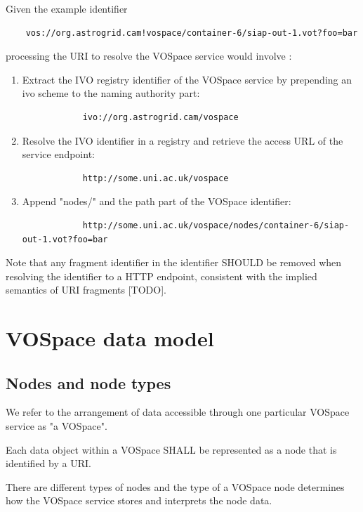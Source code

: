 \documentclass[11pt,a4paper]{ivoa}
\begin{document}
Given the example identifier

\begin{verbatim}
    vos://org.astrogrid.cam!vospace/container-6/siap-out-1.vot?foo=bar
\end{verbatim}

processing the URI to resolve the VOSpace service would involve :

\begin{enumerate}
    \item Extract the IVO registry identifier of the VOSpace service by prepending an ivo scheme to the naming authority part:
        \begin{verbatim}
            ivo://org.astrogrid.cam/vospace
        \end{verbatim}
    \item Resolve the IVO identifier in a registry and retrieve the access URL of the service endpoint:
        \begin{verbatim}
            http://some.uni.ac.uk/vospace
        \end{verbatim}
    \item Append "nodes/" and the path part of the VOSpace identifier:
        \begin{verbatim}
            http://some.uni.ac.uk/vospace/nodes/container-6/siap-out-1.vot?foo=bar
        \end{verbatim}
\end{enumerate}

Note that any fragment identifier in the identifier SHOULD be removed when resolving the identifier to a HTTP endpoint, consistent with the implied semantics of URI fragments [TODO].

\section{VOSpace data model}
\label{sec:vospace data model}

\subsection{Nodes and node types}
\label{subsec:nodes and node types}

We refer to the arrangement of data accessible through one particular VOSpace service as "a VOSpace".

Each data object within a VOSpace SHALL be represented as a node that is identified by a URI.

There are different types of nodes and the type of a VOSpace node determines how the VOSpace service stores and interprets the node data.
\end{document}
